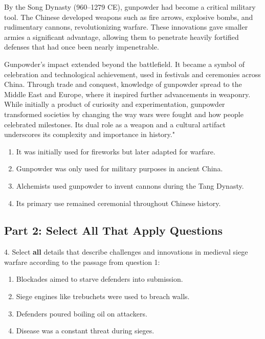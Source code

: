 \documentclass[12pt]{article}
\begin{document}
By the Song Dynasty (960–1279 CE), gunpowder had become a critical military tool. The Chinese developed weapons such as fire arrows, explosive bombs, and rudimentary cannons, revolutionizing warfare. These innovations gave smaller \\armies a significant advantage, allowing them to penetrate heavily fortified defenses that had once been nearly impenetrable.

Gunpowder's impact extended beyond the battlefield. It became a symbol of \\celebration and technological achievement, used in festivals and ceremonies across China. Through trade and conquest, knowledge of gunpowder spread to the Middle East and Europe, where it inspired further advancements in weaponry. While initially a product of curiosity and experimentation, gunpowder transformed societies by changing the way wars were fought and how people celebrated milestones. Its dual role as a weapon and a cultural artifact underscores its complexity and importance in history."\\  
\begin{enumerate}[label=\Alph*.]
    \item It was initially used for fireworks but later adapted for warfare.  
    \item Gunpowder was only used for military purposes in ancient China.  
    \item Alchemists used gunpowder to invent cannons during the Tang Dynasty.  
    \item Its primary use remained ceremonial throughout Chinese history.  
\end{enumerate}

\newpage
\subsection*{Part 2: Select All That Apply Questions}

4. Select \textbf{all} details that describe challenges and innovations in medieval siege \\warfare according to the passage from question 1:\\  
\begin{enumerate}[label=\Alph*.]
    \item Blockades aimed to starve defenders into submission.  
    \item Siege engines like trebuchets were used to breach walls.  
    \item Defenders poured boiling oil on attackers.  
    \item Disease was a constant threat during sieges.  
\end{enumerate}
\end{document}
